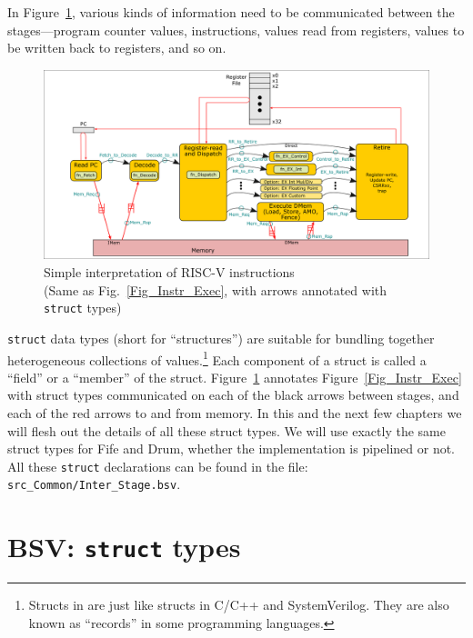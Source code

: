 In Figure~\ref{Fig_Simple_Instr_Exec_w_structs}, various kinds of
information need to be communicated between the stages---program
counter values, instructions, values read from registers, values to be
written back to registers, and so on.
\begin{figure}[htbp]
  \centerline{\includegraphics[width=6in,angle=0]{Figures/Fig_Instr_Exec_w_structs}}
  \caption{\label{Fig_Simple_Instr_Exec_w_structs}
           Simple interpretation of RISC-V instructions \\
	   \hmmmm\hmm (Same as Fig.~\ref{Fig_Instr_Exec}, with arrows annotated with {\tt struct} types)}
\end{figure}
\verb|struct| data types (short for ``structures'') are suitable for
bundling together heterogeneous collections of
values.\footnote{Structs in {\BSV} are just like structs in C/C++ and
SystemVerilog.  They are also known as ``records'' in some programming
languages.}  Each component of a struct is called a ``field'' or a
``member'' of the struct.
Figure~\ref{Fig_Simple_Instr_Exec_w_structs} annotates
Figure~\ref{Fig_Instr_Exec} with struct types communicated on each of
the black arrows between stages, and each of the red arrows to and
from memory.  In this and the next few chapters we will flesh out the
details of all these struct types.  We will use exactly the same
struct types for Fife and Drum, {\ie} whether the implementation is
pipelined or not.  All these \verb|struct| declarations can be found
in the file: \verb|src_Common/Inter_Stage.bsv|.


\section{BSV: {\tt struct} types}

\label{BSV_struct_types}
\label{Sec_Mem_Req}

